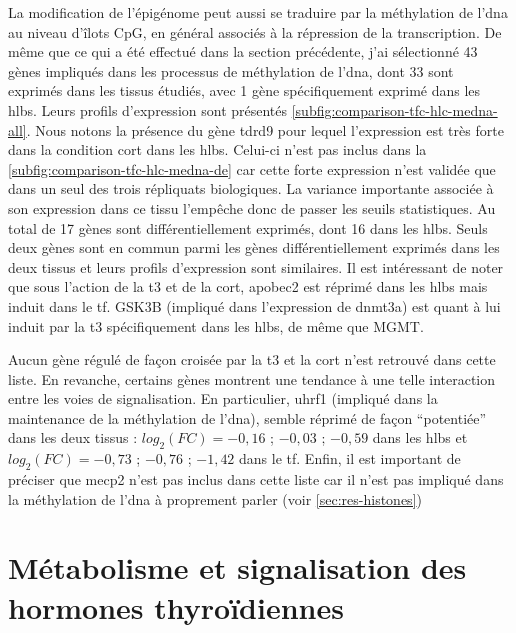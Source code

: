 \documentclass[../main.tex]{subfiles}
\begin{document}
	La modification de l'épigénome peut aussi se traduire par la méthylation de l'\gls{dna} au niveau d'îlots CpG, en général associés à la répression de la transcription.
	De même que ce qui a été effectué dans la section précédente, j'ai sélectionné 43 gènes impliqués dans les processus de méthylation de l'\gls{dna}, dont 33 sont exprimés dans les tissus étudiés, avec 1 gène spécifiquement exprimé dans les \glspl{hlb}.
	Leurs profils d'expression sont présentés \autoref{subfig:comparison-tfc-hlc-medna-all}.
	Nous notons la présence du gène \gls{tdrd9} pour lequel l'expression est très forte dans la condition \gls{cort} dans les \glspl{hlb}.
	Celui-ci n'est pas inclus dans la \autoref{subfig:comparison-tfc-hlc-medna-de} car cette forte expression n'est validée que dans un seul des trois répliquats biologiques.
	La variance importante associée à son expression dans ce tissu l'empêche donc de passer les seuils statistiques.
	Au total de 17 gènes sont différentiellement exprimés, dont 16 dans les \glspl{hlb}.
	Seuls deux gènes sont en commun parmi les gènes différentiellement exprimés dans les deux tissus et leurs profils d'expression sont similaires.
	Il est intéressant de noter que sous l'action de la \gls{t3} et de la \gls{cort}, \gls{apobec2} est réprimé dans les \glspl{hlb} mais induit dans le \gls{tf}.
	GSK3B (impliqué dans l'expression de \gls{dnmt3a}) est quant à lui induit par la \gls{t3} spécifiquement dans les \glspl{hlb}, de même que MGMT.
	\par
	Aucun gène régulé de façon croisée par la \gls{t3} et la \gls{cort} n'est retrouvé dans cette liste.
	En revanche, certains gènes montrent une tendance à une telle interaction entre les voies de signalisation.
	En particulier, \gls{uhrf1} (impliqué dans la maintenance de la méthylation de l'\gls{dna}), semble réprimé de façon ``potentiée'' dans les deux tissus :
	$log_2(FC)=-0,16$ ; $-0,03$ ; $-0,59$ dans les \glspl{hlb} et $log_2(FC)=-0,73$ ; $-0,76$ ; $-1,42$ dans le \gls{tf}.
	Enfin, il est important de préciser que \gls{mecp2} n'est pas inclus dans cette liste car il n'est pas impliqué dans la méthylation de l'\gls{dna} à proprement parler (voir \autoref{sec:res-histones})

	


\section{Métabolisme et signalisation des hormones thyroïdiennes}
\end{document}
